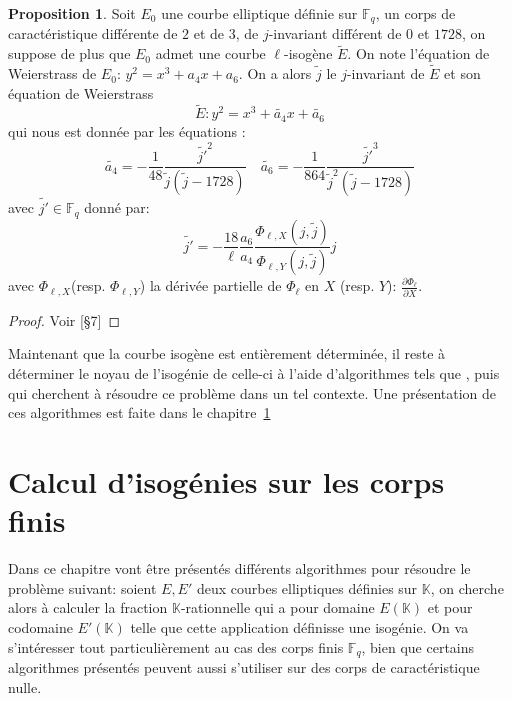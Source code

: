 \documentclass[10pt,a4paper]{book}
\theoremstyle{plain}
\theoremstyle{definition}
\theoremstyle{definition}
\theoremstyle{definition}
\theoremstyle{definition}
\newtheorem{prop}[thm]{Proposition}
\theoremstyle{definition}
\theoremstyle{remark}
\theoremstyle{remark}
\theoremstyle{definition}
\begin{document}
\begin{prop}
\label{prop:elk:nor}
Soit $E_0$ une courbe elliptique définie sur $\mathbb{F}_q$, un corps de caractéristique différente de $2$ et de $3$, de $j$-invariant différent de $0$ et $1728$, on suppose de plus que $E_0$ admet une courbe $\ell$-isogène $\tilde{E}$. On note l'équation de Weierstrass de $E_0$: $y^2=x^3+a_4x+a_6$. On a alors $\tilde{j}$ le $j$-invariant de $\tilde{E}$ et son équation de Weierstrass
\begin{equation*}
\tilde{E}:y^2=x^3+\tilde{a_4}x+\tilde{a_6}
\end{equation*}
 qui nous est donnée par les équations : 
\begin{equation*}
\tilde{a_4}=-\frac{1}{48}\frac{\tilde{j'}^2}{\tilde{j}(\tilde{j}-1728)} \quad \tilde{a_6}=-\frac{1}{864}\frac{\tilde{j'}^3}{\tilde{j}^2(\tilde{j}-1728)}
\end{equation*}
avec $\tilde{j'} \in \mathbb{F}_q$ donné par:
\begin{equation*}
\tilde{j'}=-\frac{18}{\ell}\frac{a_6}{a_4}\frac{\Phi_{\ell,X}(j,\tilde{j})}{\Phi_{\ell,Y}(j,\tilde{j})}j
\end{equation*}
avec $\Phi_{\ell,X}$(resp. $\Phi_{\ell,Y}$) la dérivée partielle de $\Phi_{\ell}$ en $X$ (resp. $Y$): $\frac{\partial \Phi_{\ell}}{\partial X} $.
\end{prop} 

\begin{proof}
Voir \cite{Schoof95}[§7]
\end{proof}

Maintenant que la courbe isogène est entièrement déterminée, il reste à déterminer le noyau de l'isogénie de celle-ci à l'aide d'algorithmes tels que \cite{Elkies1998}, \cite{BMSS08}  puis \cite{Lercier-Sirvent2008} qui cherchent à résoudre ce problème dans un tel contexte. Une présentation de ces algorithmes est faite dans le chapitre~\ref{cha:iso:computing}

\chapter{Calcul d'isogénies sur les corps finis}
\label{cha:iso:computing}
Dans ce chapitre vont être présentés différents algorithmes pour résoudre le problème suivant: soient $E, E'$ deux courbes elliptiques définies sur $\mathbb{K}$, on cherche alors à calculer la fraction $\mathbb{K}$-rationnelle qui a pour domaine $E(\mathbb{K})$ et pour codomaine $E'(\mathbb{K})$  telle que  cette application  définisse une isogénie.
On va s'intéresser tout particulièrement au cas des corps finis $\mathbb{F}_q$, bien que certains algorithmes présentés peuvent aussi s'utiliser sur des corps de caractéristique nulle.
\end{document}
